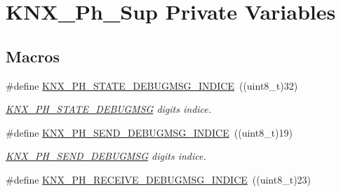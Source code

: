 \hypertarget{group___k_n_x___p_h___sup___private___variables}{}\section{K\+N\+X\+\_\+\+Ph\+\_\+\+Sup Private Variables}
\label{group___k_n_x___p_h___sup___private___variables}
\subsection*{Macros}
\begin{DoxyCompactItemize}
\item 
\#define \hyperlink{group___k_n_x___p_h___sup___private___variables_ga4337350e8fd2ce76fcfc8a820acff39e}{K\+N\+X\+\_\+\+P\+H\+\_\+\+S\+T\+A\+T\+E\+\_\+\+D\+E\+B\+U\+G\+M\+S\+G\+\_\+\+I\+N\+D\+I\+CE}~((uint8\+\_\+t)32)\hypertarget{group___k_n_x___p_h___sup___private___variables_ga4337350e8fd2ce76fcfc8a820acff39e}{}\label{group___k_n_x___p_h___sup___private___variables_ga4337350e8fd2ce76fcfc8a820acff39e}

\begin{DoxyCompactList}\small\item\em \hyperlink{group___k_n_x___p_h___sup___private___variables_gaa18f29dc3cf5b41ce81bcf264601d400}{K\+N\+X\+\_\+\+P\+H\+\_\+\+S\+T\+A\+T\+E\+\_\+\+D\+E\+B\+U\+G\+M\+SG} digits indice. \end{DoxyCompactList}\item 
\#define \hyperlink{group___k_n_x___p_h___sup___private___variables_gad1f9e6675f34456d40cf7c08b9bd305f}{K\+N\+X\+\_\+\+P\+H\+\_\+\+S\+E\+N\+D\+\_\+\+D\+E\+B\+U\+G\+M\+S\+G\+\_\+\+I\+N\+D\+I\+CE}~((uint8\+\_\+t)19)\hypertarget{group___k_n_x___p_h___sup___private___variables_gad1f9e6675f34456d40cf7c08b9bd305f}{}\label{group___k_n_x___p_h___sup___private___variables_gad1f9e6675f34456d40cf7c08b9bd305f}

\begin{DoxyCompactList}\small\item\em \hyperlink{group___k_n_x___p_h___sup___private___variables_ga16f43b8d36bcc39b90564fac102ac721}{K\+N\+X\+\_\+\+P\+H\+\_\+\+S\+E\+N\+D\+\_\+\+D\+E\+B\+U\+G\+M\+SG} digits indice. \end{DoxyCompactList}\item 
\#define \hyperlink{group___k_n_x___p_h___sup___private___variables_gacc017b9a5b70a1082a3713dbc43ac62c}{K\+N\+X\+\_\+\+P\+H\+\_\+\+R\+E\+C\+E\+I\+V\+E\+\_\+\+D\+E\+B\+U\+G\+M\+S\+G\+\_\+\+I\+N\+D\+I\+CE}~((uint8\+\_\+t)23)\hypertarget{group___k_n_x___p_h___sup___private___variables_gacc017b9a5b70a1082a3713dbc43ac62c}{}\label{group___k_n_x___p_h___sup___private___variables_gacc017b9a5b70a1082a3713dbc43ac62c}


\end{DoxyCompactItemize}
